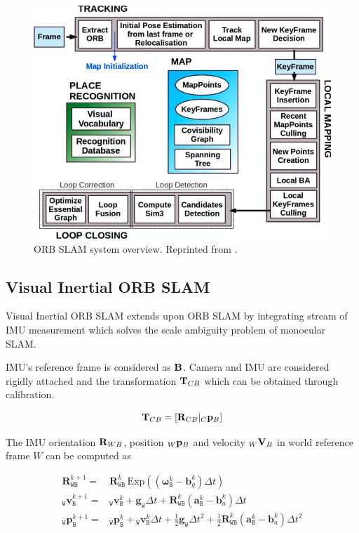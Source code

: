 \begin{figure}
	\centering
	\includegraphics[width=5in]{figures/orb_slam1}
	\caption[ORB SLAM architecture]{\small 
		ORB SLAM system overview. Reprinted from . }
	\label{fig:orb_slam1}
\end{figure}

\subsection{Visual Inertial ORB SLAM}

Visual Inertial ORB SLAM  extends upon ORB SLAM by integrating stream of IMU measurement which solves the scale ambiguity problem of monocular SLAM.

IMU's reference frame is considered as ${\bf B}$. Camera and IMU are considered rigidly attached and the transformation ${\bf T}_{CB}$ which can be obtained through calibration.

\begin{equation}
{\bf T}_{CB} = [{\bf R}_{CB} \vert _C{\bf p}_B]
\end{equation}

The IMU orientation ${\bf R}_{WB}$, position $_W{\bf p}_B$ and velocity $_W{\bf V}_B$ in world reference frame $W$ can be computed as

\begin{align} \mathbf {R}^{k+1}_\mathtt {WB} = & \mathbf {R}^{k}_\mathtt {WB} \, \text{Exp}\left(\left(\boldsymbol {\omega }^k_\mathtt {B} - \boldsymbol {b}^k_g\right)\Delta t\right) \nonumber\\ _\mathtt {W}\mathbf {v}^{k+1}_\mathtt {B} = & {_\mathtt {W}\mathbf {v}^{k}_\mathtt {B}} + \mathbf {g}_\mathtt {W} \Delta t + \mathbf {R}^{k}_\mathtt {WB} \left(\boldsymbol {a}^k_\mathtt {B} - \boldsymbol {b}^k_a\right)\Delta t \nonumber\\ _\mathtt {W}\mathbf {p}^{k+1}_\mathtt {B} = & {_\mathtt {W}\mathbf {p}^{k}_\mathtt {B}} + {_\mathtt {W}\mathbf {v}^{k}_\mathtt {B}} \Delta t + \frac{1}{2}\mathbf {g}_\mathtt {W} \Delta t^2 + \frac{1}{2} \mathbf {R}^{k}_\mathtt {WB} \left(\boldsymbol {a}^k_\mathtt {B} - \boldsymbol {b}^k_a\right)\Delta t^2 \end{align}

